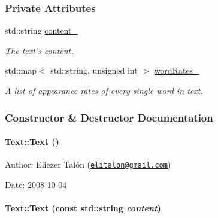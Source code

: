 \subsubsection*{Private Attributes}
\begin{CompactItemize}
\item 
\hypertarget{class_text_8c5acddb86730d41099c87da7e386f6c}{
std::string \hyperlink{class_text_8c5acddb86730d41099c87da7e386f6c}{content\_\-}}
\label{class_text_8c5acddb86730d41099c87da7e386f6c}

\begin{CompactList}\small\item\em The text's content. \item\end{CompactList}\item 
\hypertarget{class_text_5f7e6b9d9ba0dbd7c1b4070ab42f1de1}{
std::map$<$ std::string, unsigned int $>$ \hyperlink{class_text_5f7e6b9d9ba0dbd7c1b4070ab42f1de1}{wordRates\_\-}}
\label{class_text_5f7e6b9d9ba0dbd7c1b4070ab42f1de1}

\begin{CompactList}\small\item\em A list of appearance rates of every single word in text. \item\end{CompactList}\end{CompactItemize}


\subsubsection{Constructor \& Destructor Documentation}
\hypertarget{class_text_b3e26143fccc52699bcc5149cae852bc}{
\paragraph[Text]{\setlength{\rightskip}{0pt plus 5cm}Text::Text ()}\hfill}
\label{class_text_b3e26143fccc52699bcc5149cae852bc}


\begin{Desc}
\item[Author:]Eliezer Talón (\href{mailto:elitalon@gmail.com}{\tt elitalon@gmail.com}) \end{Desc}
\begin{Desc}
\item[Date:]2008-10-04 \end{Desc}
\hypertarget{class_text_c3c20ee8baeb7b88e2622724f57e50a2}{
\paragraph[Text]{\setlength{\rightskip}{0pt plus 5cm}Text::Text (const std::string {\em content})}\hfill}
\label{class_text_c3c20ee8baeb7b88e2622724f57e50a2}


